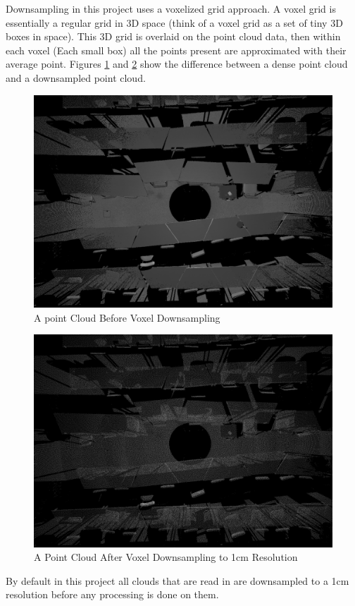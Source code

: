 	Downsampling in this project uses a voxelized grid approach. A voxel grid is essentially a regular grid in 3D space (think of a voxel grid as a set of tiny 3D boxes in space). This 3D grid is overlaid on the point cloud data, then within each voxel (Each small box) all the points present are approximated with their average point. Figures \ref{BeforeVoxelDownsampling} and \ref{AfterVoxelDownsampling} show the difference between a dense point cloud and a downsampled point cloud.
	
	\begin{figure}[H]
		\centering
		\includegraphics[width=0.75\linewidth]{Includes/images/Voxel/before}
		\caption{A point Cloud Before Voxel Downsampling}
		\label{BeforeVoxelDownsampling}
	\end{figure}
	
	\begin{figure}[H]
		\centering
		\includegraphics[width=0.75\linewidth]{Includes/images/Voxel/after}
		\caption{A Point Cloud After Voxel Downsampling to 1cm Resolution}
		\label{AfterVoxelDownsampling}
	\end{figure}

	By default in this project all clouds that are read in are downsampled to a 1cm resolution before any processing is done on them.
	
